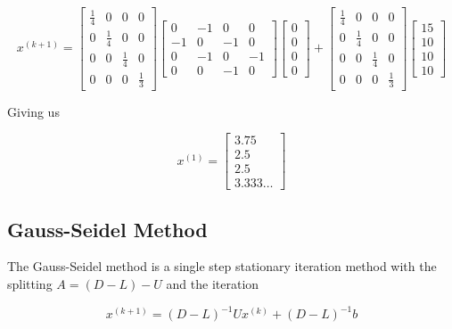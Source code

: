 \[
    x^{(k + 1)} = 
    \begin{bmatrix}
        \frac{1}{4} & 0 & 0 & 0 \\ 
        0 & \frac{1}{4} & 0 & 0 \\ 
        0 & 0 & \frac{1}{4} & 0 \\
        0 & 0 & 0 & \frac{1}{3} 
    \end{bmatrix}
    \begin{bmatrix}
        0 & -1 & 0 & 0 \\ 
        -1 & 0 & -1 & 0 \\ 
        0 & -1 & 0 & -1 \\ 
        0 & 0 & -1 & 0
    \end{bmatrix}
    \begin{bmatrix}       
        0 \\ 
        0 \\ 
        0 \\
        0 
    \end{bmatrix}
    +
    \begin{bmatrix}
         \frac{1}{4} & 0 & 0 & 0 \\ 
          0 & \frac{1}{4} & 0 & 0 \\ 
          0 & 0 & \frac{1}{4} & 0 \\    
          0 & 0 & 0 & \frac{1}{3} 
    \end{bmatrix}
    \begin{bmatrix}
        15 \\ 
        10 \\ 
        10 \\ 
        10
    \end{bmatrix}
\]

Giving us

\[
    x^{(1)} = 
    \begin{bmatrix}
        3.75 \\ 
        2.5 \\ 
        2.5 \\ 
        3.333\ldots
    \end{bmatrix}
\]

\subsection{Gauss-Seidel Method}

The Gauss-Seidel method is a single step stationary iteration method with the splitting
\(A = (D - L) - U\) and the iteration

\[
    x^{(k + 1)} = (D - L)^{-1}Ux^{(k)} + (D - L)^{-1}b
\]

